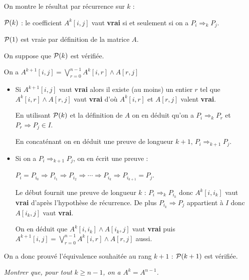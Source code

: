 \begin{Answer}
On montre le résultat par récurrence sur $k$ :

${\cal P}(k)$ : le coefficient $A^k[i, j]$ vaut {\bf vrai} si et seulement si on a $P_{i} \Rightarrow_{k} P_{j}$.

${\cal P}(1)$ est vraie par définition de la matrice $A$.

On suppose que ${\cal P}(k)$ est vérifiée.

On a $\displaystyle A^{k+1}[i, j] = \bigvee_{r=0}^{n-1} A^{k}[i, r]\wedge A[r, j]$

\begin{itemize}
\item Si $A^{k+1}[i, j]$ vaut {\bf vrai} alors il existe (au moins) un entier $r$ tel que $A^{k}[i, r]\wedge A[r, j]$ vaut {\bf vrai} d'où $A^{k}[i, r]$ et $A[r, j]$ valent {\bf vrai}. 

En utilisant ${\cal P}(k)$ et la définition de $A$ on en déduit qu'on a $P_i \Rightarrow_k P_r$ et $P_r \Rightarrow P_j \in I$. 

En concaténant on en déduit une preuve de longueur $k+1$,  $P_i \Rightarrow_{k+1} P_j$.

\item Si on a $P_i \Rightarrow_{k+1} P_j$, on en écrit une preuve :

$P_i = P_{i_0} \Rightarrow P_{i_1} \Rightarrow P_{i_2} \Rightarrow \cdots \Rightarrow P_{i_k} \Rightarrow P_{i_{k+1}} = P_j$.

Le début fournit une preuve de longueur $k$ : $P_i \Rightarrow_{k} P_{i_k}$ donc $A^k[i, i_k]$ vaut {\bf vrai} d'après l'hypothèse de récurrence. De plus $P_{i_k} \Rightarrow P_j$ appartient à $I$ donc $A[i_k, j]$ vaut {\bf vrai}.

On en déduit que $A^{k}[i, i_k]\wedge A[i_k, j]$ vaut {\bf vrai} puis
$\displaystyle A^{k+1}[i, j] = \bigvee_{r=0}^{n-1} A^{k}[i, r]\wedge A[r, j]$  aussi.
\end{itemize}

On a donc prouvé l'équivalence souhaitée au rang $k+1$ : ${\cal P}(k+1)$ est vérifiée.
\end{Answer}
\begin{Exercise}\it
Montrer que, pour tout $k\ge n-1$, on a $A^k =A^{n-1}$.
\end{Exercise}
